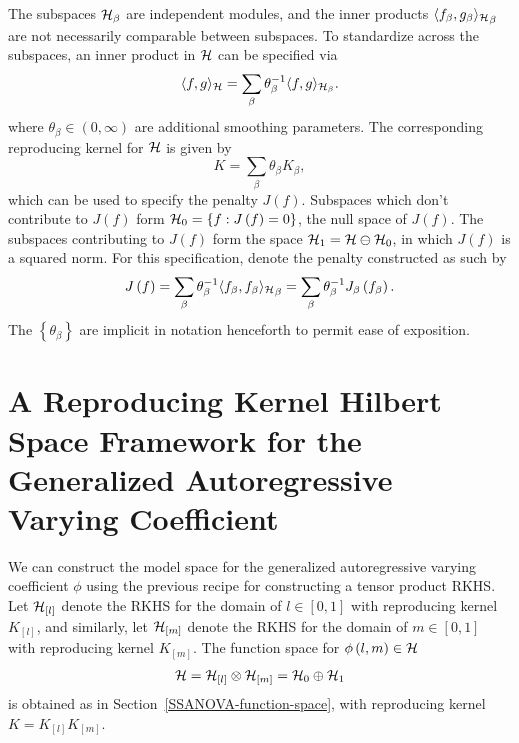 The subspaces $\mathcal{H}_\beta$ are independent modules, and the inner products $\langle f_\beta,g_\beta {\rangle_{\mathcal{H}}}_\beta$ are not necessarily comparable between subspaces. To standardize across the subspaces, an inner product in $\mathcal{H}$ can be specified via
\begin{equation} \label{eq:multi-term-inner-product}
\langle f,g \rangle_{\mathcal{H}} = \sum_\beta \theta_\beta^{-1} \langle f,g {\rangle_{\mathcal{H}_\beta}}.
\end{equation}
\noindent
where $\theta_\beta \in \left(0,\infty\right)$ are additional smoothing parameters. The corresponding reproducing kernel for $\mathcal{H}$ is given by 
\begin{equation} \label{eq:multi-term-RK}
K = \sum_\beta \theta_\beta K_\beta,
\end{equation}
\noindent
which can be used to specify the penalty $J\left(f\right)$. Subspaces which don't contribute to $J\left(f\right)$ form $\mathcal{H}_0 = \left\{f: J\left(f\right) = 0\right\}$, the null space of $J\left(f\right)$. The subspaces contributing to $J\left(f\right)$ form the space $\mathcal{H}_1 = \mathcal{H} \ominus \mathcal{H}_0$, in which $J\left(f\right)$ is a squared norm. For this specification, denote the penalty constructed as such by 
\begin{equation}\label{eq:multi-term-penalty}
J\left(f\right) =  \sum_{\beta} \theta^{-1}_\beta  \langle f_\beta,f_\beta {\rangle_{\mathcal{H}}}_\beta = \sum_{\beta} \theta^{-1}_\beta J_\beta \left( f_\beta \right).
\end{equation}
\noindent
The $\left \{ \theta_\beta \right\}$ are implicit in notation henceforth to permit ease of exposition.





\section{A Reproducing Kernel Hilbert Space Framework for the Generalized Autoregressive Varying Coefficient} \label{RKHS-for-phi}

We can construct the model space for the generalized autoregressive varying coefficient $\phi$ using the previous recipe for constructing a tensor product RKHS. Let $\mathcal{H}_{\left[l\right]}$ denote the RKHS for the domain of $l \in \left[0,1\right]$ with reproducing kernel $K_{\left[l\right]}$, and similarly, let $\mathcal{H}_{\left[m\right]}$ denote the RKHS for the domain of $m \in \left[0,1\right]$ with reproducing kernel $K_{\left[m\right]}$. The function space for $\phi\left(l,m\right) \in \mathcal{H}$
\begin{align*}
\mathcal{H} = \mathcal{H}_{\left[l\right]} \otimes \mathcal{H}_{\left[m\right]} = \mathcal{H}_0 \oplus \mathcal{H}_1
\end{align*}
\noindent
is obtained as in Section~\ref{SSANOVA-function-space}, with reproducing kernel $K = K_{\left[l\right]}K_{\left[m\right]}$.



